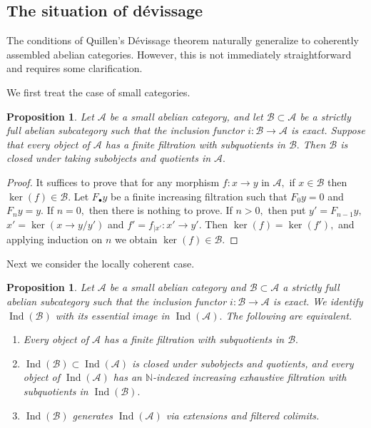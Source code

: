 \documentclass[11pt,leqno]{amsart}
\newtheorem{prop}[theo]{Proposition}
\numberwithin{equation}{section}
\def\N{\mathbb{N}}
\newcommand{\cA}{{\mathcal A}}
\newcommand{\cB}{{\mathcal B}}
\newcommand{\Ind}{\operatorname{Ind}}
\begin{document}
\subsection{The situation of d\'evissage}
\label{ssec:situation_of_devissage}

The conditions of Quillen's D\'evissage theorem \cite[Theorem 4]{Qui73} naturally generalize to coherently assembled abelian categories. However, this is not immediately straightforward and requires some clarification.

We first treat the case of small categories.

\begin{prop}\label{prop:devissage_condition_for_small}
Let $\cA$ be a small abelian category, and let $\cB\subset\cA$ be a strictly full abelian subcategory such that the inclusion functor $i:\cB\to\cA$ is exact. Suppose that every object of $\cA$ has a finite filtration with subquotients in $\cB.$ Then $\cB$ is closed under taking subobjects and quotients in $\cA.$ 
\end{prop}

\begin{proof}
It suffices to prove that for any morphism $f:x\to y$ in $\cA,$ if $x\in\cB$ then $\ker(f)\in\cB.$ Let $F_{\bullet}y$ be a finite increasing filtration such that $F_0 y=0$ and $F_n y=y.$ If $n=0,$ then there is nothing to prove. If $n>0,$ then put $y'=F_{n-1}y,$ $x'=\ker(x\to y/y')$ and $f'=f_{\mid x'}:x'\to y'.$ Then $\ker(f)=\ker(f'),$ and applying induction on $n$ we obtain $\ker(f)\in\cB.$   
\end{proof}

Next we consider the locally coherent case.

\begin{prop}\label{prop:devissage_condition_for_locally_coherent}
Let $\cA$ be a small abelian category and $\cB\subset\cA$ a strictly full abelian subcategory such that the inclusion functor $i:\cB\to\cA$ is exact. We identify $\Ind(\cB)$ with its essential image in $\Ind(\cA).$ The following are equivalent.
\begin{enumerate}[label=(\roman*),ref=(\roman*)]
	\item Every object of $\cA$ has a finite filtration with subquotients in $\cB.$ \label{devissage_for_small}
	\item $\Ind(\cB)\subset\Ind(\cA)$ is closed under subobjects and quotients, and every object of $\Ind(\cA)$ has an $\N$-indexed increasing exhaustive filtration with subquotients in $\Ind(\cB).$ \label{devissage_for_loc_coh}
	\item $\Ind(\cB)$ generates $\Ind(\cA)$ via extensions and filtered colimits. \label{loc_coh_generates_by_extensions_and_filtered_colimits}
\end{enumerate}
\end{prop}
\end{document}

